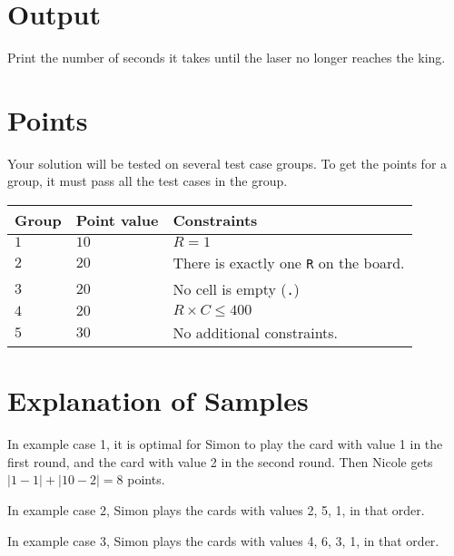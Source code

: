 \section*{Output}
Print the number of seconds it takes until the laser no longer reaches the king.

\section*{Points}
Your solution will be tested on several test case groups.
To get the points for a group, it must pass all the test cases in the group.

\noindent
\begin{tabular}{| l | l | l |}
  \hline
  \textbf{Group} & \textbf{Point value} & \textbf{Constraints} \\ \hline
    $1$    & $10$       &  $R=1$ \\ \hline
    $2$    & $20$       &  There is exactly one \texttt{R} on the board. \\ \hline
    $3$    & $20$       &  No cell is empty (\texttt{.}) \\ \hline
    $4$    & $20$       &  $R\times C \leq 400$ \\ \hline
    $5$    & $30$       & No additional constraints. \\ \hline
\end{tabular}

\section*{Explanation of Samples}
In example case 1, it is optimal for Simon to play the card with value 1 in the first round, and the card with value 2 in the second round. Then Nicole gets $|1-1| + |10-2| = 8$ points.

In example case 2, Simon plays the cards with values 2, 5, 1, in that order.

In example case 3, Simon plays the cards with values 4, 6, 3, 1, in that order.
